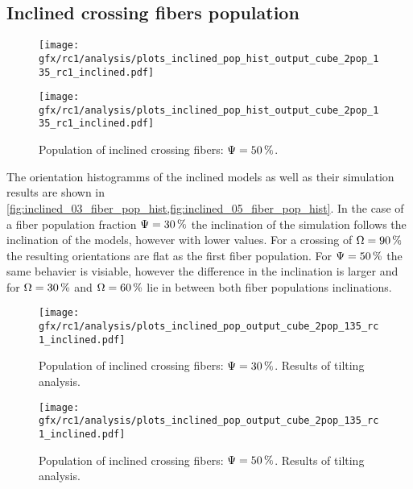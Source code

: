 \subsection{Inclined crossing fibers population}
\label{sec:resInclCross}
%
\begin{figure}[!p]
\centering
\texttt{[image: gfx/rc1/analysis/plots\_inclined\_pop\_hist\_output\_cube\_2pop\_135\_rc1\_inclined.pdf]}
\caption{Population of inclined crossing fibers: $\modelPsi=\SI{30}{\percent}$.
}
\label{fig:inclined_03_fiber_pop_hist}
% 
\vspace{2em}
\texttt{[image: gfx/rc1/analysis/plots\_inclined\_pop\_hist\_output\_cube\_2pop\_135\_rc1\_inclined.pdf]}
\caption{Population of inclined crossing fibers: $\textnormal{$\Psi$}=\SI{50}{\percent}$.
}
\label{fig:inclined_05_fiber_pop_hist}
\end{figure}
%
The orientation histogramms of the inclined models as well as their simulation results are shown in \cref{fig:inclined_03_fiber_pop_hist,fig:inclined_05_fiber_pop_hist}.
In the case of a fiber population fraction $\modelPsi=\SI{30}{\percent}$ the inclination of the simulation follows the inclination of the models, however with lower values.
For a crossing of $\textnormal{$\Omega$}=\SI{90}{\percent}$ the resulting orientations are flat as the first fiber population.
For $\textnormal{$\Psi$}=\SI{50}{\percent}$ the same behavier is visiable, however the difference in the inclination is larger and for  $\textnormal{$\Omega$}=\SI{30}{\percent}$ and $\textnormal{$\Omega$}=\SI{60}{\percent}$ lie in between both fiber populations inclinations.
\par
%
\begin{figure}[!p]
\centering
\texttt{[image: gfx/rc1/analysis/plots\_inclined\_pop\_output\_cube\_2pop\_135\_rc1\_inclined.pdf]}
\caption{Population of inclined crossing fibers: $\modelPsi=\SI{30}{\percent}$. Results of tilting analysis.}
\label{fig:inclined_03_fiber_pop_rofl}
\end{figure}
%
\begin{figure}[!p]
\centering
\texttt{[image: gfx/rc1/analysis/plots\_inclined\_pop\_output\_cube\_2pop\_135\_rc1\_inclined.pdf]}
\caption{Population of inclined crossing fibers: $\textnormal{$\Psi$}=\SI{50}{\percent}$. Results of tilting analysis.}
\label{fig:inclined_05_fiber_pop_rofl}
\end{figure}
